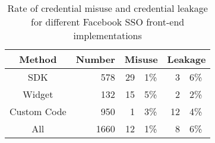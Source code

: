 \begin{table}[b]\centering
\begin{threeparttable}
\begin{tabular}{|c|r|r@{.}l|r@{.}l|}
\multicolumn{1}{c}{Method} & \multicolumn{1}{c}{Number} & \multicolumn{2}{c}{Misuse} & \multicolumn{2}{c}{Leakage} \\
\hline
SDK & 578 & 29 & 1\% & 3 & 6\%\\
\hline
Widget & 132 & 15 & 5\% & 2 & 2\%\\
\hline
Custom Code & 950 & 1 & 3\% & 12 & 4\%\\
\hline\hline
All & 1660  & 12 & 1\% & 8 & 6\%\\
\hline
\end{tabular}
\end{threeparttable}
\caption{Rate of credential misuse and credential leakage for different Facebook SSO front-end implementations}
\label{tab:ssoscan_study_front-end}
\end{table}